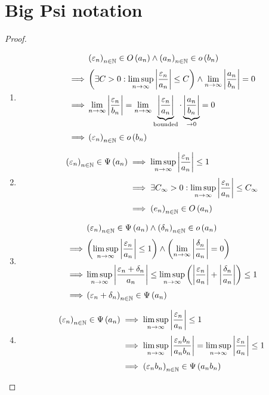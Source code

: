 \section{Big Psi notation}



\begin{proof} ~
  \begin{enumerate}
    \item \label{proof:littleo_rule}

      \begin{align}
        & \seq{\epsilon_n}\in\bigo{a_n} \land \seq{a_n} \in \littleo{b_n} \nl
        \implies & \left(\exists C > 0: \limsup_{n\to\infty} \abs{\frac{\epsilon_n}{a_n}} \le C\right) \land \lim_{n\to\infty} \abs{\frac{a_n}{b_n}} = 0 \nl
        \implies & \lim_{n\to\infty} \abs{\frac{\epsilon_n}{b_n}} = \lim_{n\to\infty} \underbrace{\abs{\frac{\epsilon_n}{a_n}}}_{\text{bounded}} \cdot \underbrace{\abs{\frac{a_n}{b_n}}}_{\to 0} = 0 \nl
        \implies & \seq{\epsilon_n} \in \littleo{b_n}
      \end{align}
    \item

      \begin{align}
        \seq{\epsilon_n} \in \bigpsi{a_n} & \implies \limsup_{n\to\infty} \abs{\frac{\epsilon_n}{a_n}} \le 1 \nl
                                          & \implies \exists C_\infty > 0 : \limsup_{n\to\infty} \abs{\frac{\epsilon_n}{a_n}} \le C_\infty \nl
                                          & \implies \seq{e_n} \in \bigo{a_n}
      \end{align}

    \item

      \begin{align}
        & \seq{\epsilon_n} \in \bigpsi{a_n} \land \seq{\delta_n} \in \littleo{a_n} \nl
        \implies& \left(\limsup_{n\to\infty} \abs{\frac{\epsilon_n}{a_n}} \le 1\right) \land \left(\lim_{n\to\infty} \abs{\frac{\delta_n}{a_n}} = 0\right) \nl
        \implies& \limsup_{n\to\infty} \abs{\frac{\epsilon_n+\delta_n}{a_n}} \le \limsup_{n\to\infty} \left(\abs{\frac{\epsilon_n}{a_n}}+\abs{\frac{\delta_n}{a_n}}\right) \le 1 \nl
        \implies& \seq{\epsilon_n+\delta_n} \in \bigpsi{a_n}
      \end{align}

    \item

      \begin{align}
        \seq{\epsilon_n} \in \bigpsi{a_n}  & \implies \limsup_{n\to\infty} \abs{\frac{\epsilon_n}{a_n}} \le 1 \nl
        & \implies \limsup_{n\to\infty} \abs{\frac{\epsilon_n b_n}{a_n b_n}} = \limsup_{n\to\infty} \abs{\frac{\epsilon_n}{a_n}} \le 1 \nl
        & \implies \seq{\epsilon_n b_n} \in \bigpsi{a_n b_n}
      \end{align}


\end{enumerate}
\end{proof}
